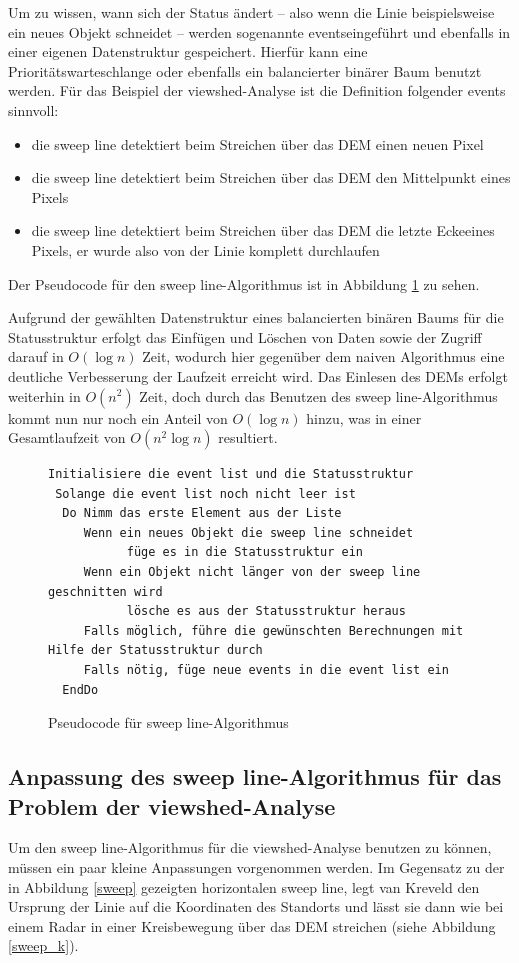 Um zu wissen, wann sich der Status ändert -- also wenn die Linie beispielsweise ein neues Objekt schneidet -- werden sogenannte \glqq events\grqq eingeführt
und ebenfalls in einer eigenen Datenstruktur gespeichert. Hierfür kann eine Prioritätswarteschlange oder ebenfalls ein balancierter binärer Baum 
benutzt werden. Für das Beispiel der viewshed-Analyse ist die Definition folgender events sinnvoll: 
\begin{itemize}
 \item die sweep line detektiert beim Streichen über das DEM einen neuen Pixel
 \item die sweep line detektiert beim Streichen über das DEM den Mittelpunkt eines Pixels
 \item die sweep line detektiert beim Streichen über das DEM die \glqq letzte Ecke\grqq eines Pixels, er wurde also von der Linie komplett durchlaufen
\end{itemize}

Der Pseudocode für den sweep line-Algorithmus ist in Abbildung \ref{pseudo} zu sehen.
\vspace{5pt}

Aufgrund der gewählten Datenstruktur eines balancierten binären Baums für die Statusstruktur erfolgt das Einfügen und Löschen von Daten sowie der 
Zugriff darauf in $O(\log n)$ Zeit, wodurch hier gegenüber dem naiven Algorithmus eine deutliche Verbesserung der Laufzeit erreicht wird. Das 
Einlesen des DEMs erfolgt weiterhin in $O(n^2)$ Zeit, doch durch das Benutzen des sweep line-Algorithmus kommt nun nur noch ein Anteil von 
$O(\log n)$ hinzu, was in einer Gesamtlaufzeit von $O(n^2\log n)$ resultiert.

\begin{figure}[!ht]
 \centering
 \begin{BVerbatim}
Initialisiere die event list und die Statusstruktur
 Solange die event list noch nicht leer ist 
  Do Nimm das erste Element aus der Liste 
     Wenn ein neues Objekt die sweep line schneidet
	       füge es in die Statusstruktur ein
     Wenn ein Objekt nicht länger von der sweep line geschnitten wird
	       lösche es aus der Statusstruktur heraus
     Falls möglich, führe die gewünschten Berechnungen mit Hilfe der Statusstruktur durch      
     Falls nötig, füge neue events in die event list ein
  EndDo
\end{BVerbatim}
\caption{Pseudocode für sweep line-Algorithmus}
\label{pseudo}
\end{figure}

\subsection{Anpassung des sweep line-Algorithmus für das Problem der viewshed-Analyse}
\label{sweep_adjust}
Um den sweep line-Algorithmus für die viewshed-Analyse benutzen zu können, müssen ein paar kleine Anpassungen vorgenommen werden. Im Gegensatz zu 
der in Abbildung \ref{sweep} gezeigten horizontalen sweep line, legt van Kreveld den Ursprung der Linie auf die Koordinaten des Standorts und lässt 
sie dann wie bei einem Radar in einer Kreisbewegung über das DEM streichen (siehe Abbildung \ref{sweep_k}).


